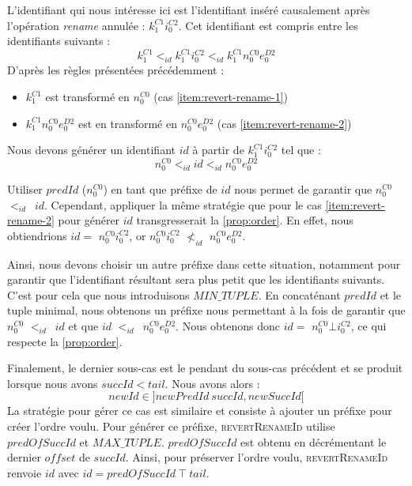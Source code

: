 \documentclass[12pt]{thesul}
\newcommand{\trm}[1]{\mathit{#1}}
\newcommand{\id}[3]{$\trm{#1}^{\trm{#2}}_{\trm{#3}}$}
\newcommand{\lid}{$<_{id}$~}
\begin{document}
L'identifiant qui nous intéresse ici est l'identifiant inséré causalement après l'opération \emph{rename} annulée : \id{k}{C1}{1}\id{i}{C2}{0}.
Cet identifiant est compris entre les identifiants suivants :
\[k^{C1}_{1} <_{id} k^{C1}_{1}i^{C2}_{0} <_{id} k^{C1}_{1}n^{C0}_{0}e^{D2}_{0}\]
D'après les règles présentées précédemment :
\begin{itemize}
  \item \id{k}{C1}{1} est transformé en \id{n}{C0}{0} (cas \ref{item:revert-rename-1})
  \item \id{k}{C1}{1}\id{n}{C0}{0}\id{e}{D2}{0} est en transformé en \id{n}{C0}{0}\id{e}{D2}{0} (cas \ref{item:revert-rename-2})
\end{itemize}
Nous devons générer un identifiant $\trm{id}$ à partir de \id{k}{C1}{1}\id{i}{C2}{0} tel que :
\[n^{C0}_{0} <_{id} \trm{id} <_{id} n^{C0}_{0}e^{D2}_{0}\]

Utiliser $\trm{predId}$ (\id{n}{C0}{0}) en tant que préfixe de $\trm{id}$ nous permet de garantir que \id{n}{C0}{0} \lid $\trm{id}$.
Cependant, appliquer la même stratégie que pour le cas \ref{item:revert-rename-2} pour générer $\trm{id}$ transgresserait la \autoref{prop:order}.
En effet, nous obtiendrions $\trm{id} = $ \id{n}{C0}{0}\id{i}{C2}{0}, or \id{n}{C0}{0}\id{i}{C2}{0} $\nless_{id}$ \id{n}{C0}{0}\id{e}{D2}{0}.

Ainsi, nous devons choisir un autre préfixe dans cette situation, notamment pour garantir que l'identifiant résultant sera plus petit que les identifiants suivants.
C'est pour cela que nous introduisons $MIN\_TUPLE$.
En concaténant $\trm{predId}$ et le tuple minimal, nous obtenons un préfixe nous permettant à la fois de garantir que \id{n}{C0}{0} \lid $\trm{id}$ et que $\trm{id}$ \lid \id{n}{C0}{0}\id{e}{D2}{0}.
Nous obtenons donc $\trm{id} = $ \id{n}{C0}{0}$\bot$\id{i}{C2}{0}, ce qui respecte la \autoref{prop:order}.

Finalement, le dernier sous-cas est le pendant du sous-cas précédent et se produit lorsque nous avons $\trm{succId} < \trm{tail}$.
Nous avons alors :
\[\trm{newId} \in ]\trm{newPredId~succId}, \trm{newSuccId}[\]
La stratégie pour gérer ce cas est similaire et consiste à ajouter un préfixe pour créer l'ordre voulu.
Pour générer ce préfixe, \textsc{revertRenameId} utilise  $\trm{predOfSuccId}$ et $MAX\_TUPLE$.
$\trm{predOfSuccId}$ est obtenu en décrémentant le dernier $\trm{offset}$ de $\trm{succId}$.
Ainsi, pour préserver l'ordre voulu, \textsc{revertRenameId} renvoie $\trm{id}$ avec $\trm{id} = \trm{predOfSuccId~\top~tail}$.
\end{document}
